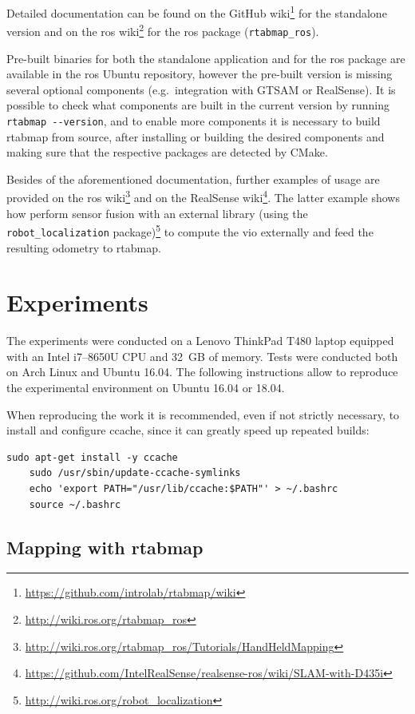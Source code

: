 \documentclass[11pt, letterpaper, twoside]{article}
\begin{document}
Detailed documentation can be found on the GitHub
wiki\footnote{\url{https://github.com/introlab/rtabmap/wiki}} for the
standalone version and on the \gls{ros}
wiki\footnote{\url{http://wiki.ros.org/rtabmap_ros}} for the \gls{ros} package
(\texttt{rtabmap\_ros}).

Pre-built binaries for both the standalone application and for the \gls{ros}
package are available in the \gls{ros} Ubuntu repository, however the pre-built
version is missing several optional components (e.g.~integration with GTSAM or
RealSense). It is possible to check what components are built in the current
version by running \texttt{rtabmap -{}-version}, and to enable more components
it is necessary to build \gls{rtabmap} from source, after installing or
building the desired components and making sure that the respective packages
are detected by CMake.

Besides of the aforementioned documentation, further examples of usage are
provided on the \gls{ros}
wiki\footnote{\url{http://wiki.ros.org/rtabmap_ros/Tutorials/HandHeldMapping}}
and on the RealSense
wiki\footnote{\url{https://github.com/IntelRealSense/realsense-ros/wiki/SLAM-with-D435i}}.
The latter example shows how perform sensor fusion with an external library
(using the \texttt{robot\_localization}
package)\footnote{\url{http://wiki.ros.org/robot_localization}} to compute the
\gls{vio} externally and feed the resulting odometry to \gls{rtabmap}.

\section{Experiments}

The experiments were conducted on a Lenovo ThinkPad T480 laptop equipped with
an Intel i7--8650U CPU and 32~GB of memory. Tests were conducted both on Arch
Linux and Ubuntu 16.04. The following instructions allow to reproduce the
experimental environment on Ubuntu 16.04 or 18.04.

When reproducing the work it is recommended, even if not strictly necessary, to
install and configure ccache, since it can greatly speed up repeated builds:
\begin{Verbatim}[samepage=true]
    sudo apt-get install -y ccache
    sudo /usr/sbin/update-ccache-symlinks
    echo 'export PATH="/usr/lib/ccache:$PATH"' > ~/.bashrc
    source ~/.bashrc
\end{Verbatim}

\subsection{Mapping with \acs{rtabmap}}\label{sec:rtabmap-setup}
\end{document}
